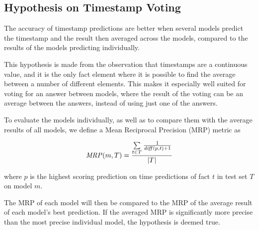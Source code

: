 \subsection{Hypothesis on Timestamp Voting}
\label{sec:hypothesis_timestamp_voting}

\begin{hypothesis}
\label{hyp:timestamp_voting}
The accuracy of timestamp predictions are better when several models predict the timestamp and the result then averaged across the models, compared to the results of the models predicting individually.
\end{hypothesis}

This hypothesis is made from the observation that timestamps are a continuous value, and it is the only fact element where it is possible to find the average between a number of different elements. This makes it especially well suited for voting for an answer between models, where the result of the voting can be an average between the answers, instead of using just one of the answers.

To evaluate the models individually, as well as to compare them with the average results of all models, we define a Mean Reciprocal Precision (MRP) metric as

\begin{equation}
\begin{gathered}
\mathit{MRP}(m, T) = \frac{\sum\limits_{t \in T} \frac{1}{\mathit{diff}(p, t) + 1}}{|T|}
\end{gathered}
\end{equation}

\noindent
where $p$ is the highest scoring prediction on time predictions of fact $t$ in test set $T$ on model $m$.

The MRP of each model will then be compared to the MRP of the average result of each model's best prediction. If the averaged MRP is significantly more precise than the most precise individual model, the hypothesis is deemed true.




